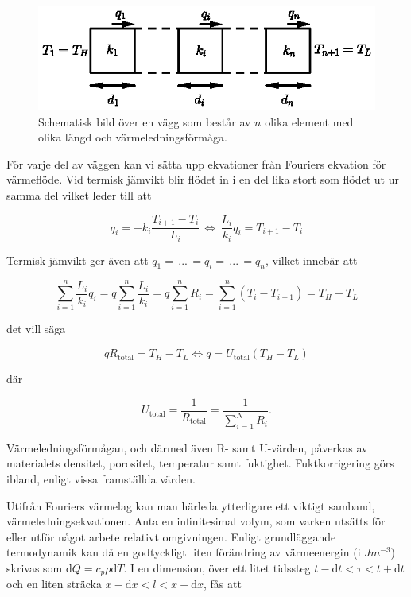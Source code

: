 \begin{figure}[hpbt]
\centering
\includegraphics[scale=1.2]{images/wall.eps}
\caption{Schematisk bild över en vägg som består av $n$ olika element med olika
längd och värmeledningsförmåga.}\label{fig:staticwallmethod:wall}
\end{figure}

För varje del av väggen kan vi sätta upp ekvationer från Fouriers ekvation för värmeflöde. Vid termisk jämvikt blir flödet in i en del lika stort som flödet ut ur samma del vilket leder till att

\begin{equation}
\label{eq:staticwallmethod:rod}
q_i = -k_i\frac{T_{i+1}-T_{i}}{L_i} \, \Leftrightarrow \, \frac{L_i}{k_i}q_i = T_{i+1}-T_{i}
\end{equation}

Termisk jämvikt ger även att $q_1 = \, ... \, = q_i = \, ... \, = q_n$, vilket innebär att

\begin{equation}
\sum_{i=1}^n \frac{L_i}{k_i}q_i = q\sum_{i=1}^n \frac{L_i}{k_i} = q\sum_{i=1}^n R_i = \sum_{i=1}^n \left( T_{i}-T_{i+1} \right) = T_H - T_L 
\end{equation}

det vill säga

\begin{equation}
q R_\text{total} = T_H - T_L \Leftrightarrow q = U_\text{total} \left( T_H - T_L \right)
\end{equation}

där

\begin{equation}\label{eq:summationU}
U_\text{total} = \frac{1}{R_\text{total}} = \frac{1}{\sum_{i=1}^N R_i}.
\end{equation}

Värmeledningsförmågan, och därmed även R- samt U-värden, påverkas av materialets densitet, porositet, temperatur samt fuktighet. Fuktkorrigering görs ibland, enligt vissa framställda värden.

Utifrån Fouriers värmelag kan man härleda ytterligare ett viktigt samband, värmeledningsekvationen. Anta en infinitesimal volym, som varken utsätts för eller utför något arbete relativt omgivningen. Enligt grundläggande termodynamik kan då en godtyckligt liten förändring av värmeenergin (i $\unit{J m^{-3}}$) skrivas som $\mathrm{d}Q = c_p \rho \mathrm{d}T$.  I en dimension, över ett litet tidssteg $t-\mathrm{d}t< \tau < t+\mathrm{d}t$ och en liten sträcka $x-\mathrm{d}x < l < x+\mathrm{d}x$, fås att

